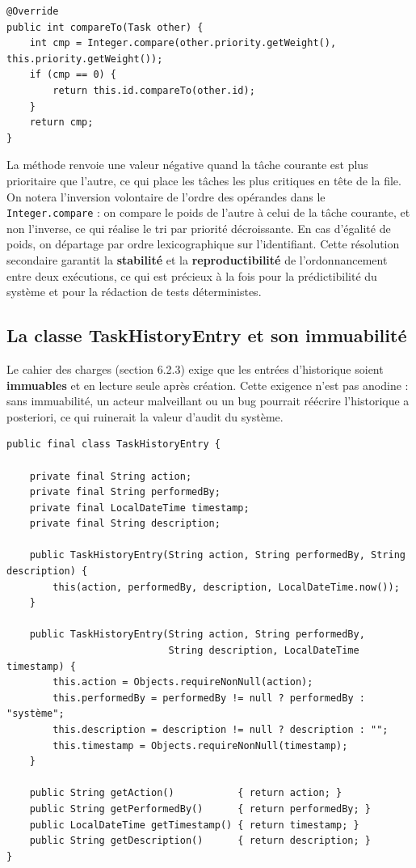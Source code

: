 \documentclass[11pt]{article}
\begin{document}
\begin{lstlisting}[caption={Comparaison par priorité}]
@Override
public int compareTo(Task other) {
    int cmp = Integer.compare(other.priority.getWeight(), this.priority.getWeight());
    if (cmp == 0) {
        return this.id.compareTo(other.id);
    }
    return cmp;
}
\end{lstlisting}

La méthode renvoie une valeur négative quand la tâche courante est plus
prioritaire que l'autre, ce qui place les tâches les plus critiques en
tête de la file. On notera l'inversion volontaire de l'ordre des
opérandes dans le \texttt{Integer.compare} : on compare le poids de
l'autre à celui de la tâche courante, et non l'inverse, ce qui réalise
le tri par priorité décroissante. En cas d'égalité de poids, on
départage par ordre lexicographique sur l'identifiant. Cette résolution
secondaire garantit la \textbf{stabilité} et la \textbf{reproductibilité}
de l'ordonnancement entre deux exécutions, ce qui est précieux à la fois
pour la prédictibilité du système et pour la rédaction de tests
déterministes.

\subsection{La classe TaskHistoryEntry et son immuabilité}
Le cahier des charges (section 6.2.3) exige que les entrées d'historique
soient \textbf{immuables} et en lecture seule après création. Cette
exigence n'est pas anodine : sans immuabilité, un acteur malveillant ou
un bug pourrait réécrire l'historique a posteriori, ce qui ruinerait la
valeur d'audit du système.

\begin{lstlisting}[caption={Classe TaskHistoryEntry, totalement immuable}]
public final class TaskHistoryEntry {

    private final String action;
    private final String performedBy;
    private final LocalDateTime timestamp;
    private final String description;

    public TaskHistoryEntry(String action, String performedBy, String description) {
        this(action, performedBy, description, LocalDateTime.now());
    }

    public TaskHistoryEntry(String action, String performedBy,
                            String description, LocalDateTime timestamp) {
        this.action = Objects.requireNonNull(action);
        this.performedBy = performedBy != null ? performedBy : "système";
        this.description = description != null ? description : "";
        this.timestamp = Objects.requireNonNull(timestamp);
    }

    public String getAction()           { return action; }
    public String getPerformedBy()      { return performedBy; }
    public LocalDateTime getTimestamp() { return timestamp; }
    public String getDescription()      { return description; }
}
\end{lstlisting}
\end{document}
